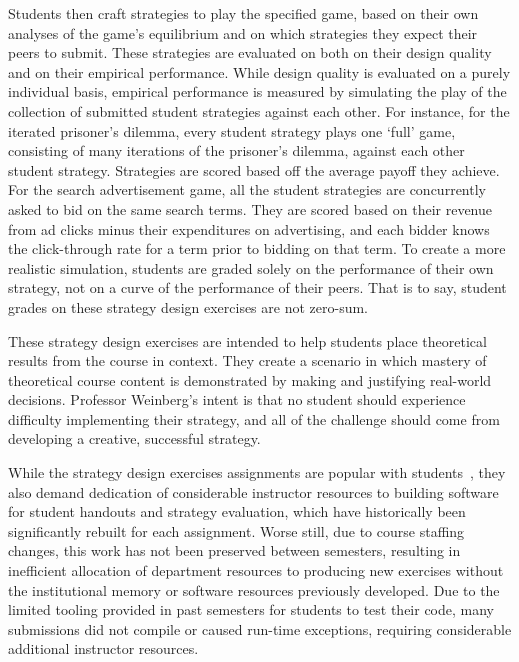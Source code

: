 \documentclass[pageno]{jpaper}
\begin{document}
Students then craft strategies to play the specified game, based on their own analyses of the game's equilibrium and on which strategies they expect their peers to submit.
These strategies are evaluated on both on their design quality and on their empirical performance.
While design quality is evaluated on a purely individual basis, empirical performance is measured by simulating the play of the collection of submitted student strategies against each other.
For instance, for the iterated prisoner's dilemma, every student strategy plays one `full' game, consisting of many iterations of the prisoner's dilemma, against each other student strategy.
Strategies are scored based off the average payoff they achieve.
For the search advertisement game, all the student strategies are concurrently asked to bid on the same search terms.
They are scored based on their revenue from ad clicks minus their expenditures on advertising, and each bidder knows the click-through rate for a term prior to bidding on that term.
To create a more realistic simulation, students are graded solely on the performance of their own strategy, not on a curve of the performance of their peers.
That is to say, student grades on these strategy design exercises are not zero-sum.

These strategy design exercises are intended to help students place theoretical results from the course in context.
They create a scenario in which mastery of theoretical course content is demonstrated by making and justifying real-world decisions.
Professor Weinberg's intent is that no student should experience difficulty implementing their strategy, and all of the challenge should come from developing a creative, successful strategy.

While the strategy design exercises assignments are popular with students~\cite{cos445sp17review}, they also demand dedication of considerable instructor resources to building software for student handouts and strategy evaluation, which have historically been significantly rebuilt for each assignment.
Worse still, due to course staffing changes, this work has not been preserved between semesters, resulting in inefficient allocation of department resources to producing new exercises without the institutional memory or software resources previously developed.
Due to the limited tooling provided in past semesters for students to test their code, many submissions did not compile or caused run-time exceptions, requiring considerable additional instructor resources.
\end{document}
